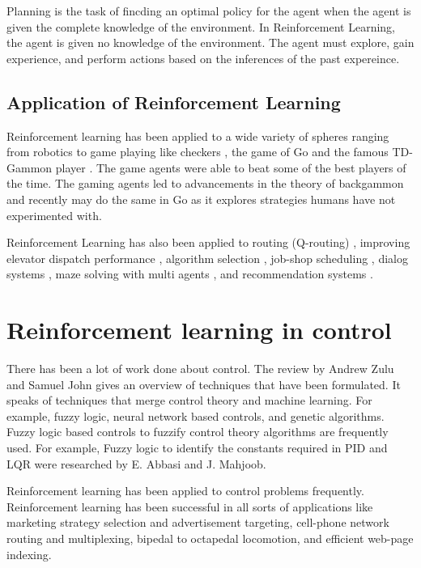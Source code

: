 \documentclass[hidelinks,BTech]{iitmdiss}
\begin{document}

Planning is the task of fincding an optimal policy for the agent when the agent is given the complete knowledge of the environment. In Reinforcement Learning, the agent is given no knowledge of the environment. The agent must explore, gain experience, and perform actions based on the inferences of the past expereince.

\subsection{Application of Reinforcement Learning}
Reinforcement learning has been applied to a wide variety of spheres ranging from robotics \cite{HelicopterPegasus} to game playing like checkers \cite{RLInCheckers}, the game of Go \cite{RLInGo} and the famous TD-Gammon player \cite{RLInBackgammon}. The game agents were able to beat some of the best players of the time. The gaming agents led to advancements in the theory of backgammon and recently may do the same in Go as it explores strategies humans have not experimented with.

Reinforcement Learning has also been applied to routing (Q-routing) \cite{RLInQRouting},
improving elevator dispatch performance \cite{RLInElevators}, algorithm
selection \cite{RLInAlgoSelection}, job-shop scheduling \cite{RLInJobShopScheduling}, dialog systems \cite{RLInDialogSystems}, maze solving with multi agents \cite{PredatorPrey}, and recommendation systems \cite{RLInRecommenders}.

\section{Reinforcement learning in control}

There has been a lot of work done about control. The review \cite{ControlForQuads} by Andrew Zulu and Samuel John gives an overview of techniques that have been formulated. It speaks of techniques that merge control theory and machine learning. For example, fuzzy logic, neural network based controls, and genetic algorithms. Fuzzy logic based controls to fuzzify control theory algorithms are frequently used. For example, Fuzzy logic to identify the constants required in PID and LQR were researched by E. Abbasi and J. Mahjoob.

Reinforcement learning has been applied to control problems frequently. Reinforcement learning has been successful in all sorts of applications like marketing strategy selection and advertisement targeting, cell-phone network routing and multiplexing, bipedal to octapedal locomotion, and efficient web-page indexing.
\end{document}
